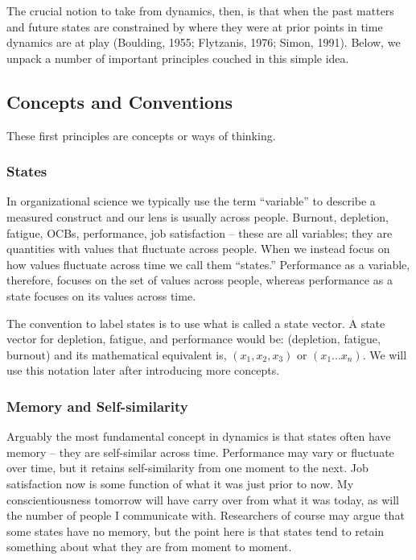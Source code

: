 \documentclass[english,,man]{apa6}
\theoremstyle{definition}
\theoremstyle{definition}
\theoremstyle{definition}
\theoremstyle{remark}
\begin{document}
The crucial notion to take from dynamics, then, is that when the past
matters and future states are constrained by where they were at prior
points in time dynamics are at play (Boulding, 1955; Flytzanis, 1976;
Simon, 1991). Below, we unpack a number of important principles couched
in this simple idea.

\hypertarget{concepts-and-conventions}{%
\subsection{Concepts and Conventions}\label{concepts-and-conventions}}

These first principles are concepts or ways of thinking.

\hypertarget{states}{%
\subsubsection{States}\label{states}}

In organizational science we typically use the term \enquote{variable}
to describe a measured construct and our lens is usually across people.
Burnout, depletion, fatigue, OCBs, performance, job satisfaction --
these are all variables; they are quantities with values that fluctuate
across people. When we instead focus on how values fluctuate across time
we call them \enquote{states.} Performance as a variable, therefore,
focuses on the set of values across people, whereas performance as a
state focuses on its values across time.

The convention to label states is to use what is called a state vector.
A state vector for depletion, fatigue, and performance would be:
(depletion, fatigue, burnout) and its mathematical equivalent is,
\((x_1, x_2, x_3)\) or \((x_1 ...x_n)\). We will use this notation later
after introducing more concepts.

\hypertarget{memory-and-self-similarity}{%
\subsubsection{Memory and
Self-similarity}\label{memory-and-self-similarity}}

Arguably the most fundamental concept in dynamics is that states often
have memory -- they are self-similar across time. Performance may vary
or fluctuate over time, but it retains self-similarity from one moment
to the next. Job satisfaction now is some function of what it was just
prior to now. My conscientiousness tomorrow will have carry over from
what it was today, as will the number of people I communicate with.
Researchers of course may argue that some states have no memory, but the
point here is that states tend to retain something about what they are
from moment to moment.
\end{document}
